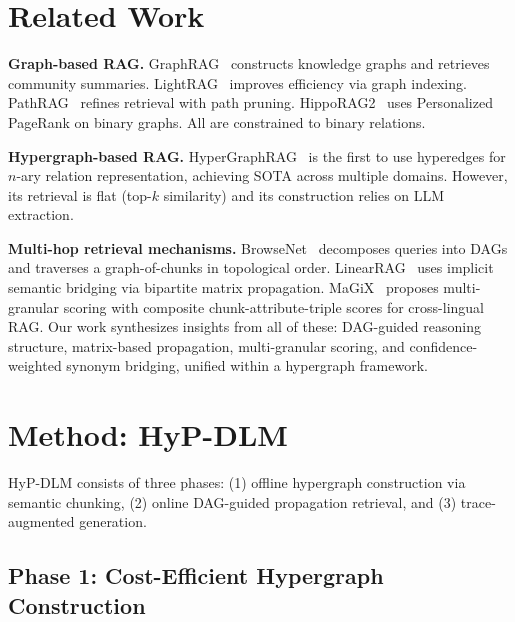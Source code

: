 \documentclass[11pt,a4paper]{article}
\begin{document}
\section{Related Work}

\textbf{Graph-based RAG.} GraphRAG~\cite{edge2024graphrag} constructs knowledge graphs and retrieves community summaries. LightRAG~\cite{guo2025lightrag} improves efficiency via graph indexing. PathRAG~\cite{chen2025pathrag} refines retrieval with path pruning. HippoRAG2~\cite{gutierrez2025hipporag2} uses Personalized PageRank on binary graphs. All are constrained to binary relations.

\textbf{Hypergraph-based RAG.} HyperGraphRAG~\cite{luo2025hypergraphrag} is the first to use hyperedges for $n$-ary relation representation, achieving SOTA across multiple domains. However, its retrieval is flat (top-$k$ similarity) and its construction relies on LLM extraction.

\textbf{Multi-hop retrieval mechanisms.} BrowseNet~\cite{browsenet2026} decomposes queries into DAGs and traverses a graph-of-chunks in topological order. LinearRAG~\cite{linearrag2026} uses implicit semantic bridging via bipartite matrix propagation. MaGiX~\cite{hieu2025magix} proposes multi-granular scoring with composite chunk-attribute-triple scores for cross-lingual RAG. Our work synthesizes insights from all of these: DAG-guided reasoning structure, matrix-based propagation, multi-granular scoring, and confidence-weighted synonym bridging, unified within a hypergraph framework.


\section{Method: HyP-DLM}

HyP-DLM consists of three phases: (1) offline hypergraph construction via semantic chunking, (2) online DAG-guided propagation retrieval, and (3) trace-augmented generation.

\subsection{Phase 1: Cost-Efficient Hypergraph Construction}
\end{document}
